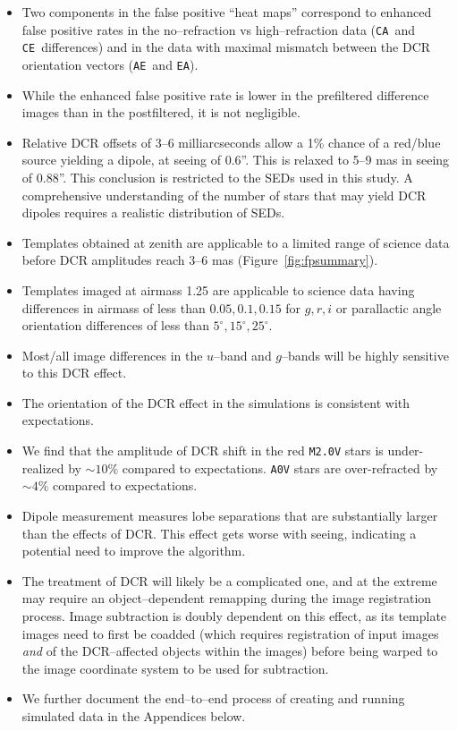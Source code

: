 \documentclass[prd, nofootinbib, floatfix, 11pt, tightenlines, times]{article}
\def\A{{\tt A}}
\def\C{{\tt C}}
\def\E{{\tt E}}
\begin{document}
\begin{itemize}
\item Two components in the false positive ``heat maps'' correspond to
  enhanced false positive rates in the no--refraction vs
  high--refraction data (\C\A\ and \C\E\ differences) and in the data
  with maximal mismatch between the DCR orientation vectors (\A\E\ and
  \E\A).

\item While the enhanced false positive rate is lower in the
  prefiltered difference images than in the postfiltered, it is not
  negligible.

\item Relative DCR offsets of 3--6 milliarcseconds allow a 1\% chance
  of a red/blue source yielding a dipole, at seeing of 0.6''.  This is
  relaxed to 5--9 mas in seeing of 0.88''.  This conclusion is
  restricted to the SEDs used in this study.  A comprehensive
  understanding of the number of stars that may yield DCR dipoles
  requires a realistic distribution of SEDs.

\item Templates obtained at zenith are applicable to a limited range
  of science data before DCR amplitudes reach 3--6 mas
  (Figure~\ref{fig:fpsummary}).

\item Templates imaged at airmass 1.25 are applicable to science data
  having differences in airmass of less than $0.05, 0.1, 0.15$ for
  $g,r,i$ or parallactic angle orientation differences of less than
  $5^{\circ}, 15^{\circ}, 25^{\circ}$.

\item Most/all image differences in the $u$--band and $g$--bands will
  be highly sensitive to this DCR effect.

\item The orientation of the DCR effect in the simulations is
  consistent with expectations.

\item We find that the amplitude of DCR shift in the red {\tt M2.0V}
  stars is under-realized by $\sim 10\%$ compared to expectations.
  {\tt A0V} stars are over-refracted by $\sim 4\%$ compared to
  expectations.

\item Dipole measurement measures lobe separations that are
  substantially larger than the effects of DCR.  This effect gets
  worse with seeing, indicating a potential need to improve the
  algorithm.

\item The treatment of DCR will likely be a complicated one, and at
  the extreme may require an object--dependent remapping during the
  image registration process.  Image subtraction is doubly dependent
  on this effect, as its template images need to first be coadded
  (which requires registration of input images {\it and} of the
  DCR--affected objects within the images) before being warped to the
  image coordinate system to be used for subtraction.

\item We further document the end--to--end process of creating and
  running simulated data in the Appendices below.

\end{itemize}
\end{document}
